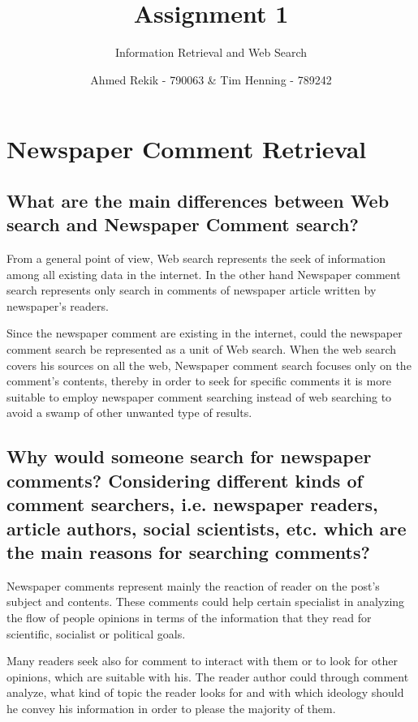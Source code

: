 \documentclass{scrartcl}
\title{Assignment 1}
\subtitle{Information Retrieval and Web Search}
\author{Ahmed Rekik - 790063 \& Tim Henning - 789242}
\begin{document}
\maketitle

\setcounter{section}{1}
\section{Newspaper Comment Retrieval}

\subsection{What are the main differences between Web search and Newspaper Comment search?}

From a general point of view, Web search represents the seek of information among all existing data in the internet. In the other hand Newspaper comment search represents only search in comments of newspaper article written by newspaper's readers.

Since the newspaper comment are existing in the internet, could the newspaper comment search be represented as a unit of Web search. When the web search covers his sources on all the web, Newspaper comment search focuses only on the comment's contents, thereby in order to seek for specific comments it is more suitable to employ newspaper comment searching instead of web searching to avoid a swamp of other unwanted type of results.

\subsection{Why would someone search for newspaper comments? Considering different kinds of comment searchers, i.e. newspaper readers, article authors, social scientists, etc. which are the main reasons for searching comments?}

Newspaper comments represent mainly the reaction of reader on the post's subject and contents. These comments could help certain specialist in analyzing the flow of people opinions in terms of the information that they read for scientific, socialist or political goals.

Many readers seek also for comment to interact with them or to look for other opinions, which are suitable with his. The reader author could through comment analyze, what kind of topic the reader looks for and with which ideology should he convey his information in order to please the majority of them.
\end{document}
